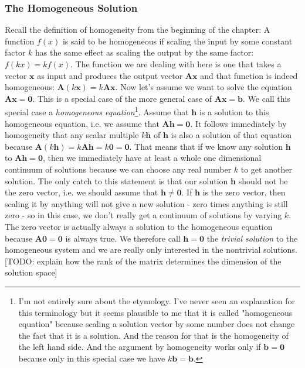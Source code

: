 \subsubsection{The Homogeneous Solution}
Recall the definition of homogeneity from the beginning of the chapter: A function $f(x)$ is said to be homogeneous if scaling the input by some constant factor $k$ has the same effect as scaling the output by the same factor: $f(k x) = k f(x)$. The function we are dealing with here is one that takes a vector $\mathbf{x}$ as input and produces the output vector $\mathbf{A x}$ and that function is indeed homogeneous: $\mathbf{A} (k \mathbf{x}) = k \mathbf{A x}$. Now let's assume we want to solve the equation $\mathbf{A x = 0}$. This is a special case of the more general case of $\mathbf{A x = b}$. We call this special case a \emph{homogeneous equation}\footnote{I'm not entirely sure about the etymology. I've never seen an explanation for this terminology but it seems plausible to me that it is called "homogeneous equation" because scaling a solution vector by some number does not change the fact that it is a solution. And the reason for that is the homogeneity of the left hand side. And the argument by homogeneity works only if $\mathbf{b=0}$ because only in this special case we have $k \mathbf{b = b}.$}. Assume that $\mathbf{h}$ is a solution to this homogeneous equation, i.e. we assume that $\mathbf{A h} = \mathbf{0}$. It follows immediately by homogeneity that any scalar multiple $k \mathbf{h}$ of $\mathbf{h}$ is also a solution of that equation because  $\mathbf{A} (k \mathbf{h}) = k \mathbf{A h} = k \mathbf{0} = \mathbf{0}$. That means that if we know any solution $\mathbf{h}$ to $\mathbf{A h = 0}$, then we immediately have at least a whole one dimensional continuum of solutions because we can choose any real number $k$ to get another solution. The only catch to this statement is that our solution $\mathbf{h}$ should not be the zero vector, i.e. we should assume that $\mathbf{h} \neq \mathbf{0}$. If $\mathbf{h}$ is the zero vector, then scaling it by anything will not give a new solution - zero times anything is still zero - so in this case, we don't really get a continuum of solutions by varying $k$. The zero vector is actually always a solution to the homogeneous equation because $\mathbf{A 0} = \mathbf{0}$ is always true. We therefore call $\mathbf{h = 0}$ the \emph{trivial solution} to the homogeneous system and we are really only interested in the nontrivial solutions. [TODO: explain how the rank of the matrix determines the dimension of the solution space]


